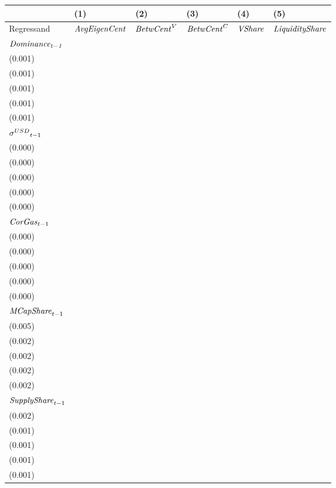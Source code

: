 \begin{tabular}{llllll}
\toprule
{} &                                   (1) &                                   (2) &                                   (3) &                                   (4) &                                   (5) \\
\midrule
Regressand                   &                  ${\it AvgEigenCent}$ &                    ${\it BetwCent}^V$ &                    ${\it BetwCent}^C$ &                        ${\it VShare}$ &                ${\it LiquidityShare}$ \\
$\it Dominance_{t-1}$        &   \makecell{$0.842^{***}$ \\ (0.001)} &   \makecell{$0.964^{***}$ \\ (0.001)} &   \makecell{$0.957^{***}$ \\ (0.001)} &   \makecell{$0.900^{***}$ \\ (0.001)} &   \makecell{$0.902^{***}$ \\ (0.001)} \\
${{\it \sigma}^{USD}}_{t-1}$ &      \makecell{$0.000^{}$ \\ (0.000)} &      \makecell{$0.000^{}$ \\ (0.000)} &     \makecell{$-0.000^{}$ \\ (0.000)} &      \makecell{$0.000^{}$ \\ (0.000)} &     \makecell{$-0.000^{}$ \\ (0.000)} \\
${{\it CorGas}}_{t-1}$       &     \makecell{$-0.000^{}$ \\ (0.000)} &     \makecell{$-0.000^{}$ \\ (0.000)} &     \makecell{$-0.000^{}$ \\ (0.000)} &     \makecell{$-0.000^{}$ \\ (0.000)} &     \makecell{$-0.000^{}$ \\ (0.000)} \\
${{\it MCapShare}}_{t-1}$    &   \makecell{$0.022^{***}$ \\ (0.005)} &   \makecell{$0.058^{***}$ \\ (0.002)} &   \makecell{$0.046^{***}$ \\ (0.002)} &   \makecell{$0.044^{***}$ \\ (0.002)} &   \makecell{$0.055^{***}$ \\ (0.002)} \\
${{\it SupplyShare}}_{t-1}$  &   \makecell{$0.033^{***}$ \\ (0.002)} &   \makecell{$0.007^{***}$ \\ (0.001)} &   \makecell{$0.004^{***}$ \\ (0.001)} &   \makecell{$0.012^{***}$ \\ (0.001)} &   \makecell{$0.003^{***}$ \\ (0.001)} \\

\end{tabular}
